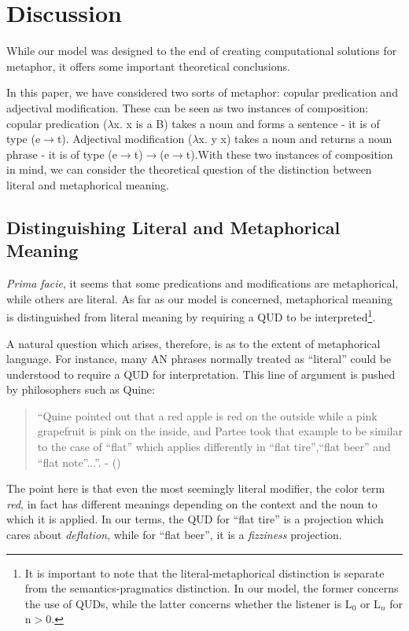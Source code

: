 \documentclass[10pt,letterpaper,twocolumn]{article}
\begin{document}
\section{Discussion} \label{discussion}

While our model was designed to the end of creating computational solutions for metaphor, it offers some important theoretical conclusions.

In this paper, we have considered two sorts of metaphor: copular predication and adjectival modification. These can be seen as two instances of composition: copular predication ($\lambda$x. x is a B) takes a noun and forms a sentence - it is of type (e$\to$t). Adjectival modification ($\lambda$x. y x) takes a noun and returns a noun phrase - it is of type (e$\to$t)$\to$(e$\to$t).With these two instances of composition in mind, we can consider the theoretical question of the distinction between literal and metaphorical meaning.


\subsection{Distinguishing Literal and Metaphorical Meaning} \label{litvsmet}

\emph{Prima facie}, it seems that some predications and modifications are metaphorical, while others are literal. As far as our model is concerned, metaphorical meaning is distinguished from literal meaning by requiring a QUD to be interpreted\footnote{It is important to note that the literal-metaphorical distinction is separate from the semantics-pragmatics distinction. In our model, the former concerns the use of QUDs, while the latter concerns whether the listener is L$_0$ or L$_n$ for n$>$0.}.

A natural question which arises, therefore, is as to the extent of metaphorical language. For instance, many AN phrases normally treated as ``literal'' could be understood to require a QUD for interpretation. This line of argument is pushed by philosophers such as Quine:
	\begin{quote}
		``Quine pointed out that a red apple is red on the outside while a pink grapefruit is pink on the inside, and Partee took that example to be similar to the case of ``flat'' which applies differently in ``flat tire'',``flat beer'' and ``flat note''...''. - (\cite{lahav}) 
	\end{quote}

The point here is that even the most seemingly literal modifier, the color term \emph{red}, in fact has different meanings depending on the context and the noun to which it is applied. In our terms, the QUD for ``flat tire'' is a projection which cares about \emph{deflation}, while for ``flat beer'', it is a \emph{fizziness} projection.
\end{document}
